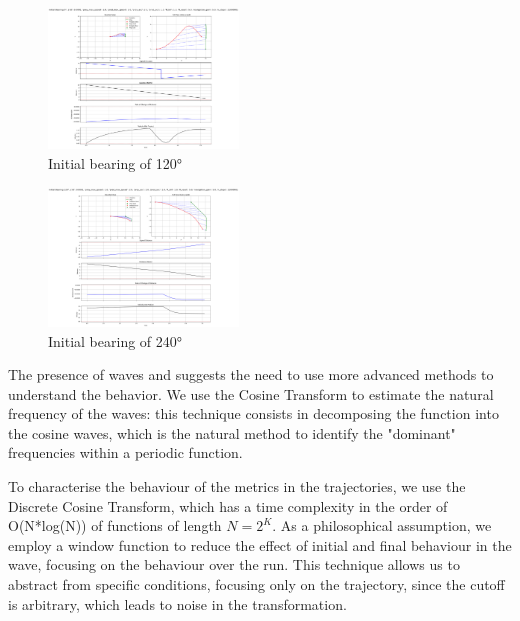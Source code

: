 \documentclass[11pt, twocolumn]{article}
\begin{document}
        \begin{figure}[H]
          \centering
          \includegraphics[width=0.45\textwidth]{figures/initial_bearing_120.png}
          \caption{Initial bearing of 120°}
          \label{fig:bear120}
        \end{figure}

        \begin{figure}[H]
          \centering
          \includegraphics[width=0.45\textwidth]{figures/initial_bearing_240.png}
          \caption{Initial bearing of 240°}
          \label{fig:bear240}
        \end{figure}

        The presence of waves and suggests the need to use more advanced methods to understand the behavior. We use the Cosine Transform to estimate the natural frequency of the waves: this technique consists in decomposing the function into the cosine waves, which is the natural method to identify the "dominant" frequencies within a periodic function.

        To characterise the behaviour of the metrics in the trajectories, we use the Discrete Cosine Transform, which has a time complexity in the order of O(N*log(N)) of functions of length $N = 2^K$. As a philosophical assumption, we employ a window function to reduce the effect of initial and final behaviour in the wave, focusing on the behaviour over the run. This technique allows us to abstract from specific conditions, focusing only on the trajectory, since the cutoff is arbitrary, which leads to noise in the transformation.
\end{document}
